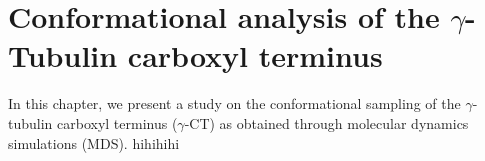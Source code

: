 \chapter{Conformational analysis of the $\gamma$-Tubulin carboxyl terminus}

In this chapter, we present a study on the conformational sampling of the $\gamma$-tubulin carboxyl terminus ($\gamma$-CT) as obtained through molecular dynamics simulations (MDS). hihihihi